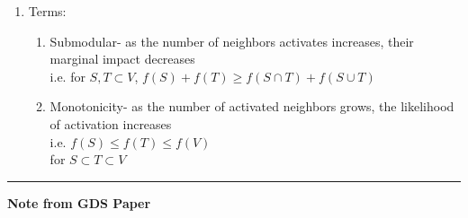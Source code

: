 \documentclass[11pt]{article}
\begin{document}
\begin{enumerate}
    \item Terms: 
    \begin{enumerate}
    
    \item Submodular- as the number of neighbors activates increases, their marginal impact decreases
    \\ i.e. for $S,T \subset V$, $f(S) + f(T) \geq f(S \cap T) + f(S \cup T)$
    
    \item Monotonicity- as the number of activated neighbors grows, the likelihood of activation increases
    \\ i.e. $f(S) \leq f(T) \leq f(V)$ \\ for $S \subset T \subset V$
    
    \end{enumerate}
    
\end{enumerate}
\smallskip
\noindent
\rule{\textwidth}{0.01in}
\textbf{Note from GDS Paper}
\end{document}
